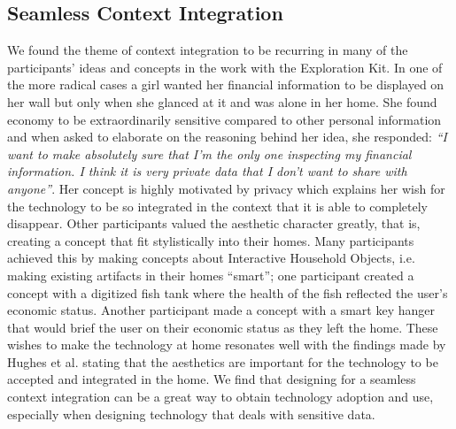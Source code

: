 \subsection{Seamless Context Integration}
We found the theme of context integration to be recurring in many of the participants’ ideas and concepts in the work with the Exploration Kit. In one of the more radical cases a girl wanted her financial information to be displayed on her wall but only when she glanced at it and was alone in her home. She found economy to be extraordinarily sensitive compared to other personal information and when asked to elaborate on the reasoning behind her idea, she responded: \emph{“I want to make absolutely sure that I’m the only one inspecting my financial information. I think it is very private data that I don’t want to share with anyone”}. Her concept is highly motivated by privacy which explains her wish for the technology to be so integrated in the context that it is able to completely disappear. Other participants valued the aesthetic character greatly, that is, creating a concept that fit stylistically into their homes. Many participants achieved this by making concepts about Interactive Household Objects, i.e. making existing artifacts in their homes “smart”; one participant created a concept with a digitized fish tank where the health of the fish reflected the user’s economic status. Another participant made a concept with a smart key hanger that would brief the user on their economic status as they left the home. These wishes to make the technology at home resonates well with the findings made by Hughes et al. \cite{hughes1998understanding} stating that the aesthetics are important for the technology to be accepted and integrated in the home. We find that designing for a seamless context integration can be a great way to obtain technology adoption and use, especially when designing technology that deals with sensitive data.

